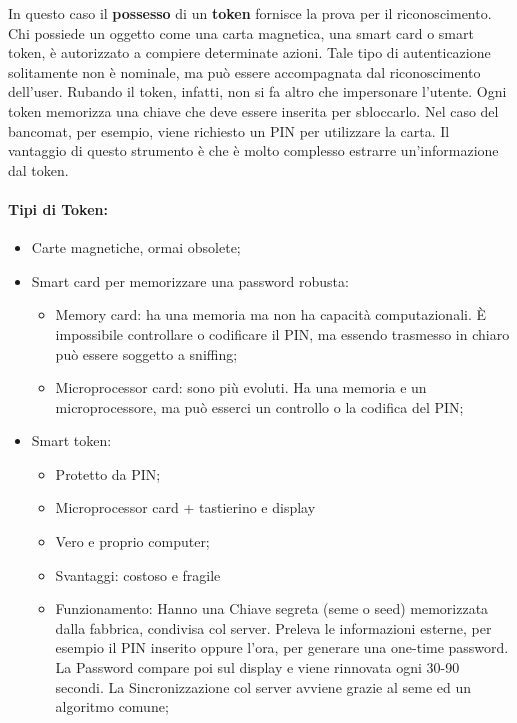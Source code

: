 In questo caso il \textbf{possesso} di un \textbf{token} fornisce la prova per
il riconoscimento.
Chi possiede un oggetto come una carta magnetica, una smart card o smart token,
è autorizzato a compiere determinate azioni. Tale tipo di autenticazione
solitamente non è nominale, ma può essere accompagnata dal riconoscimento
dell’user. Rubando il token, infatti, non si fa altro che impersonare l’utente.
Ogni token memorizza una chiave che deve essere inserita per sbloccarlo.
Nel caso del bancomat, per esempio, viene richiesto un PIN per utilizzare la carta.
Il vantaggio di questo strumento è che è molto complesso estrarre
un’informazione dal token.

\paragraph{Tipi di Token: }

\begin{itemize}
      \item Carte magnetiche, ormai obsolete;
      \item Smart card per memorizzare una password robusta:
            \begin{itemize}
                  \item Memory card: ha una memoria ma non ha capacità computazionali.
                        È impossibile
                        controllare o codificare il PIN, ma essendo trasmesso in chiaro può
                        essere soggetto
                        a sniffing;
                  \item Microprocessor card: sono più evoluti. Ha una memoria e
                        un microprocessore, ma
                        può esserci un controllo o la codifica del PIN;
            \end{itemize}
      \item Smart token:
            \begin{itemize}
                  \item Protetto da PIN;
                  \item  Microprocessor card + tastierino e display
                  \item  Vero e proprio computer;
                  \item  Svantaggi: costoso e fragile
                  \item  Funzionamento: Hanno una Chiave segreta (seme o seed)
                        memorizzata dalla fabbrica,
                        condivisa col server. Preleva le informazioni esterne,
                        per esempio il PIN inserito oppure
                        l'ora, per generare una one-time password.
                        La Password compare poi sul display e viene
                        rinnovata ogni 30-90 secondi.
                        La Sincronizzazione col server avviene grazie al seme ed un
                        algoritmo comune;
            \end{itemize}
\end{itemize}

